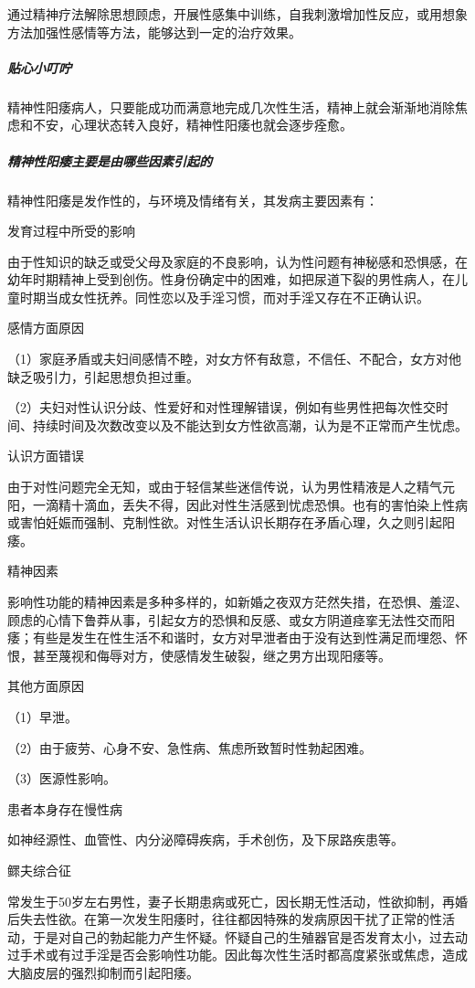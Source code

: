 \begin{enumerate}
通过精神疗法解除思想顾虑，开展性感集中训练，自我刺激增加性反应，或用想象方法加强性感情等方法，能够达到一定的治疗效果。

\subparagraph{贴心小叮咛}

精神性阳痿病人，只要能成功而满意地完成几次性生活，精神上就会渐渐地消除焦虑和不安，心理状态转入良好，精神性阳痿也就会逐步痊愈。

\subparagraph{精神性阳痿主要是由哪些因素引起的}

精神性阳痿是发作性的，与环境及情绪有关，其发病主要因素有：

发育过程中所受的影响

由于性知识的缺乏或受父母及家庭的不良影响，认为性问题有神秘感和恐惧感，在幼年时期精神上受到创伤。性身份确定中的困难，如把尿道下裂的男性病人，在儿童时期当成女性抚养。同性恋以及手淫习惯，而对手淫又存在不正确认识。

感情方面原因

（1）家庭矛盾或夫妇间感情不睦，对女方怀有敌意，不信任、不配合，女方对他缺乏吸引力，引起思想负担过重。

（2）夫妇对性认识分歧、性爱好和对性理解错误，例如有些男性把每次性交时间、持续时间及次数改变以及不能达到女方性欲高潮，认为是不正常而产生忧虑。

认识方面错误

由于对性问题完全无知，或由于轻信某些迷信传说，认为男性精液是人之精气元阳，一滴精十滴血，丢失不得，因此对性生活感到忧虑恐惧。也有的害怕染上性病或害怕妊娠而强制、克制性欲。对性生活认识长期存在矛盾心理，久之则引起阳痿。

精神因素

影响性功能的精神因素是多种多样的，如新婚之夜双方茫然失措，在恐惧、羞涩、顾虑的心情下鲁莽从事，引起女方的恐惧和反感、或女方阴道痉挛无法性交而阳痿；有些是发生在性生活不和谐时，女方对早泄者由于没有达到性满足而埋怨、怀恨，甚至蔑视和侮辱对方，使感情发生破裂，继之男方出现阳痿等。

其他方面原因

（1）早泄。

（2）由于疲劳、心身不安、急性病、焦虑所致暂时性勃起困难。

（3）医源性影响。

患者本身存在慢性病

如神经源性、血管性、内分泌障碍疾病，手术创伤，及下尿路疾患等。

鳏夫综合征

常发生于50岁左右男性，妻子长期患病或死亡，因长期无性活动，性欲抑制，再婚后失去性欲。在第一次发生阳痿时，往往都因特殊的发病原因干扰了正常的性活动，于是对自己的勃起能力产生怀疑。怀疑自己的生殖器官是否发育太小，过去动过手术或有过手淫是否会影响性功能。因此每次性生活时都高度紧张或焦虑，造成大脑皮层的强烈抑制而引起阳痿。


\end{enumerate}
